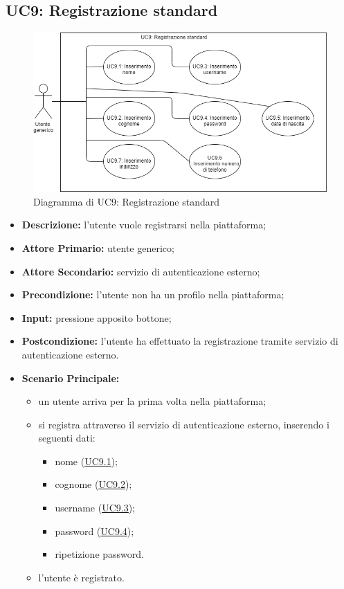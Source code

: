 \newpage
\subsection{UC9: Registrazione standard}
\label{sec:UC9}
\begin{figure}[!ht]
    \caption{Diagramma di UC9: Registrazione standard}
    \vspace{10px}
    \includegraphics[scale=0.5]{../../../Images/AnalisiRequisiti/UC09.png}
    \centering
\end{figure}
\begin{itemize}
    \item \textbf{Descrizione:} l'utente vuole registrarsi nella piattaforma;
    \item \textbf{Attore Primario:} utente generico;
    \item \textbf{Attore Secondario:} servizio di autenticazione esterno;
    \item \textbf{Precondizione:} l'utente non ha un profilo nella piattaforma;
    \item \textbf{Input:} pressione apposito bottone;
    \item \textbf{Postcondizione:} l'utente ha effettuato la registrazione tramite servizio di autenticazione esterno.
    \item \textbf{Scenario Principale:}
          \begin{itemize}
              \item un utente arriva per la prima volta nella piattaforma;
              \item si registra attraverso il servizio di autenticazione esterno, inserendo i seguenti dati:
                    \begin{itemize}
                        \item nome (\hyperref[sec:UC9.1]{\underline{UC9.1}});
                        \item cognome (\hyperref[sec:UC9.2]{\underline{UC9.2}});
                        \item username (\hyperref[sec:UC9.3]{\underline{UC9.3}});
                        \item password (\hyperref[sec:UC9.4]{\underline{UC9.4}});
                        \item ripetizione password.
                    \end{itemize}
              \item l'utente è registrato.
          \end{itemize}
\end{itemize}

